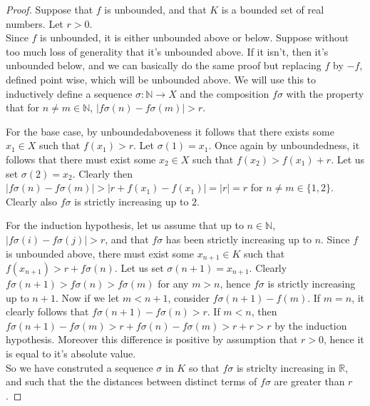 \documentclass[11pt]{article}
\newcommand{\R}{\mathbb{R}}
\newcommand{\N}{\mathbb{N}}
\theoremstyle{definition}
\begin{document}
\begin{proof}

Suppose that $f$ is unbounded, and that $K$ is a bounded set of real numbers. Let $r> 0$.\\

 Since $f$ is unbounded, it is either unbounded above or below. Suppose without too much loss of generality that it's unbounded above. If it isn't, then it's unbounded below, and we can basically do the same proof but replacing $f$ by $-f$, defined point wise, which will be unbounded above. We will use this to inductively define a sequence $\sigma: \N \to X$ and the composition $f\sigma$ with the property that for $n\ne m\in \N$, $|f\sigma(n)-f\sigma(m)| > r$. 
 
 For the base case, by unboundedaboveness it follows that there exists some $x_1\in X$ such that $f(x_1) > r$. Let $\sigma(1) = x_1$. Once again by unboundedness, it follows that there must exist some $x_2\in X$ such that $f(x_2) > f(x_1) + r$. Let us set $\sigma(2) = x_2$. Clearly then $|f\sigma(n) - f\sigma(m)| > |r + f(x_1) - f(x_1)| = |r| = r$ for $n\ne m \in \{1,2\}$. Clearly also $f\sigma$ is strictly increasing up to $2$.
 
 For the induction hypothesis, let us assume that up to $n\in \N$, $|f\sigma(i)-f\sigma(j) | > r$, and that $f\sigma$ has been strictly increasing up to $n$. Since $f$ is unbounded above, there must exist some $x_{n+1}\in K$ such that $f(x_{n+1}) > r + f\sigma(n)$. Let us set $\sigma(n+1) = x_{n+1}$. Clearly $f\sigma(n+1) > f\sigma(n) > f\sigma(m)$ for any $m>n$, hence $f\sigma$ is strictly increasing up to $n+1$. Now if we let $m< n + 1$, consider $f\sigma(n+1) - f(m)$. If $m = n$, it clearly follows that $f\sigma(n+1) - f\sigma(n) > r$. If $m < n$, then $f\sigma(n + 1) - f\sigma(m) > r + f\sigma(n) - f\sigma(m) > r + r> r$ by the induction hypothesis. Moreover this difference is positive by assumption that $r> 0$, hence it is equal to it's absolute value.\\
 
 
 So we have construted a sequence $\sigma$ in $K$ so that $f\sigma$ is striclty increasing in $ \R$, and such that the the distances between distinct terms of $f\sigma$ are greater than $r$. 
 

\end{proof}
\end{document}
